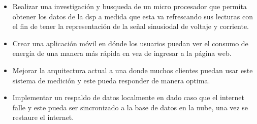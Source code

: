 \begin{itemize}
    \itemsep0em
    \item Realizar una investigación y busqueda de un micro procesador que permita obtener los datos de la dsp a medida que esta va refrescando sus lecturas con el fin de tener la representación de la señal sinusiodal de voltaje y corriente.
    \item Crear una aplicación móvil en dónde los usuarios puedan ver el consumo de energía de una manera más rápida en vez de ingresar a la página web.
    \item Mejorar la arquitectura actual a una donde muchos clientes puedan usar este sistema de medición y este pueda responder de manera optima.
    \item Implementar un respaldo de datos localmente en dado caso que el internet falle y este pueda ser sincronizado a la base de datos en la nube, una vez se restaure el internet.
\end{itemize}